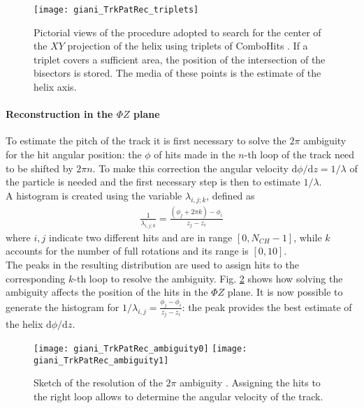 \documentclass[12pt,a4paper,openright, oneside, titlepage]{book} %
\begin{document}
\begin{figure}[h!]
\centering
\texttt{[image: giani\_TrkPatRec\_triplets]}
\caption{Pictorial views of the procedure adopted to search for the center of the $XY$ projection of the helix using triplets of ComboHits \cite{GianiPatRec:2020}. If a triplet covers a sufficient area, the position of the intersection of the bisectors is stored. 
The media of these points is the estimate of the helix axis.}
\label{_TrkPatRec_triplets}
\end{figure}


\paragraph{Reconstruction in the $\Phi Z$ plane} 
To estimate the pitch of the track it is first necessary to solve the $2\pi$ ambiguity for the hit angular position: 
the $\phi$ of hits made in the $n$-th loop of the track need to be shifted by $2\pi n$. 
To make this correction the angular velocity $\mathrm{d}\phi/\mathrm{d}z = 1/ \lambda$ of the particle is needed 
and the first necessary  step is then to estimate $1/\lambda$. \\
A histogram is created using the variable $\lambda_{i,j;k}$, defined as
\begin{align}
\frac{1}{\lambda_{i,j;k}} = \frac{(\phi_j+2\pi k)-\phi_i}{z_j-z_i}
\end{align}
where $i,j$ indicate two different hits and are in range $[0,N_{CH}-1]$, 
while $k$ accounts for the number of full rotations and its range is $[0,10]$.\\
The peaks in the resulting distribution are used to assign hits to the corresponding $k$-th loop to resolve the ambiguity. 
Fig. \ref{_TrkPatRec_ambiguity} shows how solving the ambiguity affects the position of the hits in the $\Phi Z$ plane.
It is now possible to generate the histogram for $1/\lambda_{i,j} = \frac{\phi_j-\phi_i}{z_j-z_i}$: 
the peak provides the best estimate of the helix $\mathrm{d}\phi/\mathrm{d}z$.

\begin{figure}[h!]
\centering
\texttt{[image: giani\_TrkPatRec\_ambiguity0]}
\texttt{[image: giani\_TrkPatRec\_ambiguity1]}
\caption{Sketch of the resolution of the $2\pi$ ambiguity \cite{GianiPatRec:2020}. 
Assigning the hits to the right loop allows to determine the angular velocity of the track.}
\label{_TrkPatRec_ambiguity}
\end{figure}
\end{document}
